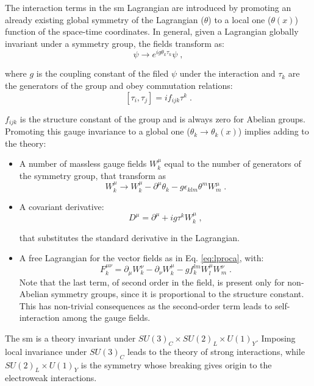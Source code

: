 The interaction terms in the \gls{sm} Lagrangian are introduced by promoting an already existing global symmetry of the Lagrangian ($\theta$) to a local one ($\theta(x)$) function of the space-time coordinates. 
In general, given a Lagrangian globally invariant under a symmetry group, the fields transform as:
\begin{equation}
\psi \rightarrow e^{ig\theta_k \tau_k} \psi  \; ,
\end{equation}

\noindent where $g$ is the coupling constant of the filed $\psi$ under the interaction and $\tau_k$ are the generators of the group and obey commutation relations: 
\begin{equation}
\left[ \tau_i, \tau_j \right] = i f_{ijk} \tau^k \; . 
\end{equation}

\noindent $f_{ijk}$ is the structure constant of the group and is always zero for Abelian groups. Promoting this gauge invariance to a global one ($\theta_k \rightarrow \theta_k(x)$) implies adding to the theory:
\begin{itemize}
\item A number of massless gauge fields $W^\mu_k$ equal to the number of generators of the symmetry group, that transform as 
\begin{equation}
W^\mu_k \rightarrow W^\mu_k - \partial^\mu \theta_k - g \epsilon_{klm} \theta^m W^\mu_m \; .
\end{equation}
\item A covariant derivative: 
\begin{equation}
D^\mu = \partial^\mu + ig\tau^kW^\mu_k \; ,
\end{equation}

\noindent that substitutes the standard derivative in the Lagrangian.
\item A free Lagrangian for the vector fields as in Eq. \ref{eq:lproca}, with:
\begin{equation}
F^{\mu \nu}_k = \partial_\mu W_k^\nu - \partial_\nu W_k^\mu - g f_k^{lm} W^\mu_l W^\nu_m \; .
\end{equation}
\noindent Note that the last term, of second order in the field, is present only for non-Abelian symmetry groups, since it is proportional to the structure constant. This has non-trivial consequences as the second-order term leads to self-interaction among the gauge fields.
\end{itemize}


The \gls{sm} is a theory invariant under $SU(3)_{C} \times SU(2)_{L} \times U(1)_{Y}$. Imposing local invariance under $SU(3)_{C}$ leads to the theory of strong interactions, while $SU(2)_{L} \times U(1)_{Y}$ is the symmetry whose breaking gives origin to the electroweak interactions. 

